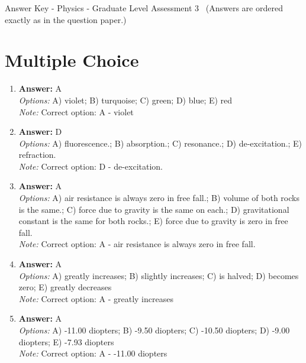 \documentclass[12pt]{article}
\begin{document}
\begin{center}
Answer Key - Physics - Graduate Level Assessment 3 \
\small (Answers are ordered exactly as in the question paper.)
\end{center}

\section*{Multiple Choice}
\begin{enumerate}[label=\arabic*.]
\item \textbf{Answer:} A
\\ \textit{Options:} A) violet; B) turquoise; C) green; D) blue; E) red
\\ \textit{Note:} Correct option: A - violet
\item \textbf{Answer:} D
\\ \textit{Options:} A) fluorescence.; B) absorption.; C) resonance.; D) de-excitation.; E) refraction.
\\ \textit{Note:} Correct option: D - de-excitation.
\item \textbf{Answer:} A
\\ \textit{Options:} A) air resistance is always zero in free fall.; B) volume of both rocks is the same.; C) force due to gravity is the same on each.; D) gravitational constant is the same for both rocks.; E) force due to gravity is zero in free fall.
\\ \textit{Note:} Correct option: A - air resistance is always zero in free fall.
\item \textbf{Answer:} A
\\ \textit{Options:} A) greatly increases; B) slightly increases; C) is halved; D) becomes zero; E) greatly decreases
\\ \textit{Note:} Correct option: A - greatly increases
\item \textbf{Answer:} A
\\ \textit{Options:} A) -11.00 diopters; B) -9.50 diopters; C) -10.50 diopters; D) -9.00 diopters; E) -7.93 diopters
\\ \textit{Note:} Correct option: A - -11.00 diopters
\end{enumerate}
\end{document}
